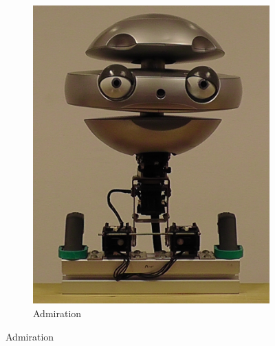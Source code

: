 \begin{figure}[ht]
\begin{subfigure}{0.2\columnwidth}
        \includegraphics[width=\columnwidth]{images/gbe/admiration.jpg}
        \caption{Admiration}
    \end{subfigure}
    

\end{figure}
